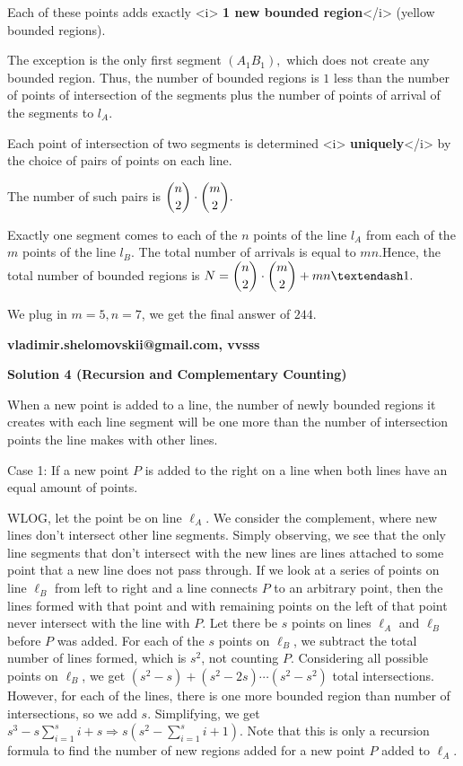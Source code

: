 \begin{enumerate}
 Each of these points adds exactly <i>\textbf{ 1 new bounded region}</i> (yellow bounded regions). 

 The exception is the only first segment $(A_1 B_1),$ which does not create any bounded region. Thus, the number of bounded regions is $1$ less than the number of points of intersection of the segments plus the number of points of arrival of the segments to $l_A.$

 Each point of intersection of two segments is determined <i>\textbf{ uniquely}</i> by the choice of pairs of points on each line. 

 The number of such pairs is $\dbinom{n}{2} \cdot \dbinom{m}{2}.$

 Exactly one segment comes to each of the $n$ points of the line $l_A$ from each of the $m$ points of the line $l_B.$ The total number of arrivals is equal to $mn.$Hence, the total number of bounded regions is $N = \dbinom{n}{2} \cdot \dbinom{m}{2} + mn – 1.$

 We plug in $m=5, n=7$, we get the final answer of $\boxed{244}$.

 \textbf{vladimir.shelomovskii@gmail.com, vvsss}

 



\textbf{Solution 4 (Recursion and Complementary Counting)}

When a new point is added to a line, the number of newly bounded regions it creates with each line segment will be one more than the number of intersection points the line makes with other lines.

 Case 1: If a new point $P$ is added to the right on a line when both lines have an equal amount of points.

 WLOG, let the point be on line $\ell_A$. We consider the complement, where new lines don't intersect other line segments. Simply observing, we see that the only line segments that don't intersect with the new lines are lines attached to some point that a new line does not pass through. If we look at a series of points on line $\ell_B$ from left to right and a line connects $P$ to an arbitrary point, then the lines formed with that point and with remaining points on the left of that point never intersect with the line with $P$. Let there be $s$ points on lines $\ell_A$ and $\ell_B$ before $P$ was added. For each of the $s$ points on $\ell_B$, we subtract the total number of lines formed, which is $s^2$, not counting $P$. Considering all possible points on $\ell_B$, we get $(s^2-s)+(s^2-2s)\cdots(s^2-s^2)$ total intersections. However, for each of the lines, there is one more bounded region than number of intersections, so we add $s$. Simplifying, we get $s^3-s\sum_{i=1}^{s}{i}+s\Longrightarrow s(s^2-\sum_{i=1}^{s}{i}+1)$. Note that this is only a recursion formula to find the number of new regions added for a new point $P$ added to $\ell_A$.


\end{enumerate}
